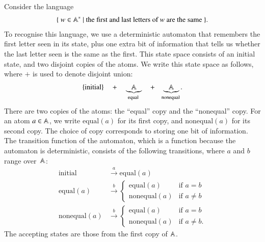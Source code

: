 \begin{myexample}\label{ex:pof-dfa}
    Consider the language 
    \begin{align*}
    \{\ w \in \mathbb A^* \ | \text{ \text{the first and last letters of $w$ are the same}}\ \}.
    \end{align*}
    To recognise this language, we use a deterministic automaton that remembers the first letter seen in its state, plus one extra bit of information that tells us whether the last letter seen is the same as the first. This state space  consists of an initial state, and two disjoint copies of the atoms. We write this state space as  follows, where $+$ is used to denote disjoint union:
    \begin{align*}
        \set{\text{initial}} 
        \quad + \quad 
        \myunderbrace{\atoms}{equal}
        \quad + \quad 
        \myunderbrace{\atoms}{nonequal}.
    \end{align*}
    There are two copies of the atoms: the ``equal'' copy and the ``nonequal'' copy. For an atom $a \in \mathbb A$, we write $\text{equal}(a)$ for its first copy, and $\text{nonequal}(a)$ for its second copy. The choice of copy corresponds to storing one bit of information.
    The  transition function of the automaton, which is a function because the automaton is deterministic, consists of the following transitions, where $a$ and $b$ range over~$\mathbb A$:
    \begin{align*}
    \text{initial}  & \stackrel a \to \text{equal}(a) \\
    \text{equal}(a) & \stackrel b \to
    \begin{cases}
        \text{equal}(a) & \text{if $a = b$} \\
        \text{nonequal}(a) & \text{if $a \neq b$}
    \end{cases}\\
    \text{nonequal}(a) & \stackrel b \to
    \begin{cases}
        \text{equal}(a) & \text{if $a = b$} \\
        \text{nonequal}(a) & \text{if $a \neq b$}.
    \end{cases}
    \end{align*}
    The accepting states are those from the first copy of $\mathbb A$. 
\end{myexample}

